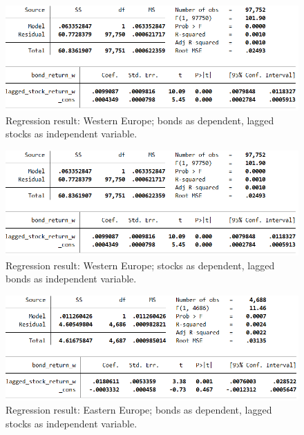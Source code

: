 \begin{figure}[h]
	\centering
	\includegraphics[width=1.0\linewidth]{figures/regression-results/regression-euw-bonds-as-dependent.PNG}
	\caption{Regression result: Western Europe; bonds as dependent, lagged stocks as independent variable. }
	\label{fig:regression-euw-bonds-as-dependent}
\end{figure}

\begin{figure}[h]
	\centering
	\includegraphics[width=1.0\linewidth]{figures/regression-results/regression-euw-bonds-as-dependent.PNG}
	\caption{Regression result: Western Europe; stocks as dependent, lagged bonds as independent variable. }
	\label{fig:regression-euw-stocks-as-dependent}
\end{figure}

\begin{figure}[h]
	\centering
	\includegraphics[width=1.0\linewidth]{figures/regression-results/regression-eue-bonds-as-dependent.PNG}
	\caption{Regression result: Eastern Europe; bonds as dependent, lagged stocks as independent variable. }
	\label{fig:regression-eue-bonds-as-dependent}
\end{figure}

